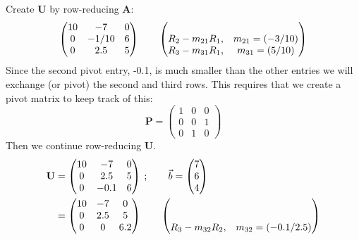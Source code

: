\documentclass[12pts, answers]{exam}
\newcommand{\ve}[1]{\ensuremath{\mathbf{#1}}}
\begin{document}
\begin{questions}
\begin{solution}
Create $\ve{U}$ by row-reducing $\ve{A}$:
%
\begin{equation}
\begin{pmatrix}
   10 & -7 & 0 \\
   0    & -1/10 & 6 \\
   0    & 2.5 & 5 \\
\end{pmatrix} \qquad \begin{pmatrix}
 & \\ R_2 - m_{21}R_1, & m_{21} = (-3 / 10) \\ 
      R_3 - m_{31}R_1, & m_{31} = (5 / 10) \end{pmatrix} \nonumber 
\end{equation}
%
Since the second pivot entry, -0.1, is much smaller than the other entries we will exchange (or pivot) the second and third rows. This requires that we create a pivot matrix to keep track of this:
\[\ve{P} = \begin{pmatrix}
1 & 0 & 0 \\
0 & 0 & 1 \\
0 & 1 & 0
\end{pmatrix}\]
Then we continue row-reducing \ve{U}.
%
\begin{align}
\ve{U} &= \begin{pmatrix}
   \baa & \bab & \bac \\
   0    & 2.5 & \bcc \\
   0    & -0.1 & \bbc \\
\end{pmatrix} \:; 
\qquad \vec{b} = \begin{pmatrix} \ba \\ \bc \\ \bb \end{pmatrix} \nonumber \\
%
&= \begin{pmatrix}
   \baa & \bab & \bac \\
   0    & 2.5  & \bcc \\
   0    & 0    & 6.2 \\
\end{pmatrix} 
\qquad
\begin{pmatrix} & \\ & \\ R_3 - m_{32}R_2, & m_{32} = (-0.1 / 2.5) \end{pmatrix} \nonumber 
\end{align}


\end{solution}
\end{questions}
\end{document}
